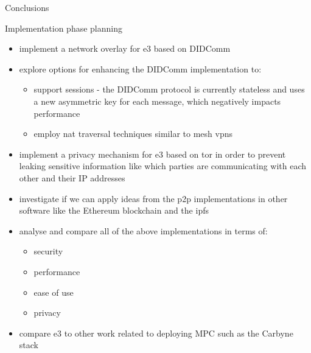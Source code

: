 \begin{frame}[fragile]{Conclusions}
\begin{block}{Implementation phase planning}
\begin{itemize}
  \begin{itemize}
  \tightlist
  \item
    using a \gls{ca} that is managed jointly using MPC
  \item
    using a form of \gls{ssi} such as \glspl{did}
  \end{itemize}
\item
  implement a network overlay for \gls{e3} based on DIDComm
\item
  explore options for enhancing the DIDComm implementation to:

  \begin{itemize}
  \tightlist
  \item
    support sessions - the DIDComm protocol is currently stateless and
    uses a new asymmetric key for each message, which negatively impacts
    performance
  \item
    employ \gls{nat} traversal techniques similar to mesh \glspl{vpn}
  \end{itemize}
\item
  implement a privacy mechanism for \gls{e3} based on \gls{tor} in order
  to prevent leaking sensitive information like which parties are
  communicating with each other and their IP addresses
\item
  investigate if we can apply ideas from the \gls{p2p} implementations
  in other software like the Ethereum
  \autocite{ethereumDocs,ethereumYellowPaper} blockchain and the
  \gls{ipfs} \autocite{ipfsDocs}
\item
  analyse and compare all of the above implementations in terms of:

  \begin{itemize}
  \tightlist
  \item
    security
  \item
    performance
  \item
    ease of use
  \item
    privacy
  \end{itemize}
\item
  compare \gls{e3} to other work related to deploying MPC such as the
  Carbyne stack\autocite{robertboschgmbhCarbyneStack2022}
\end{itemize}
\end{block}
\end{frame}
